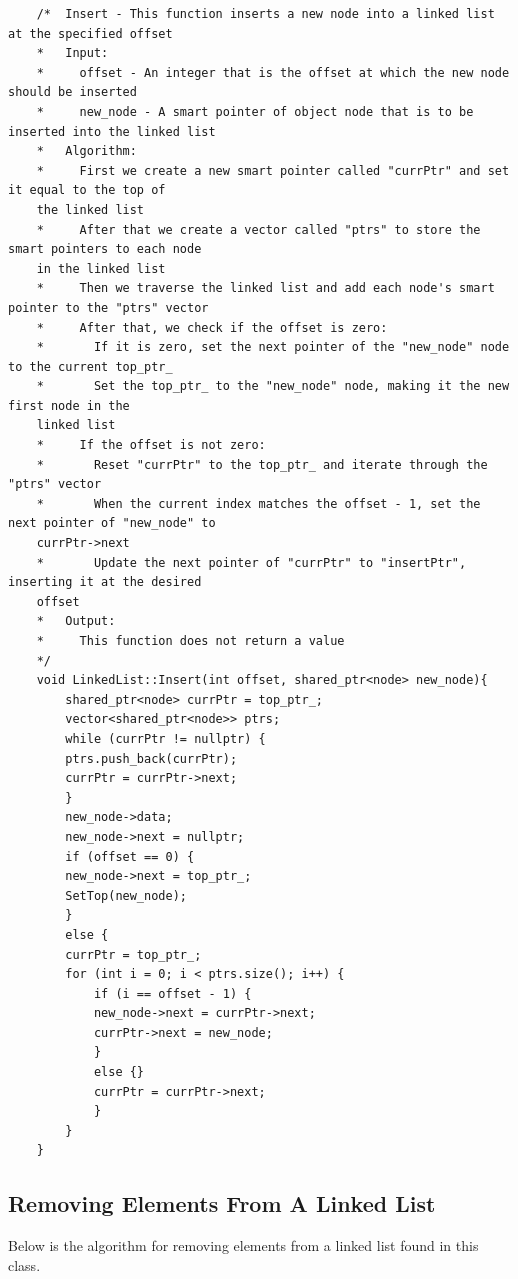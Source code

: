 \documentclass[a4paper,9pt]{article}
\begin{document}
\begin{highlight}
    \begin{verbatim}
    /*  Insert - This function inserts a new node into a linked list at the specified offset
    *   Input:
    *     offset - An integer that is the offset at which the new node should be inserted
    *     new_node - A smart pointer of object node that is to be inserted into the linked list
    *   Algorithm:
    *     First we create a new smart pointer called "currPtr" and set it equal to the top of 
    the linked list
    *     After that we create a vector called "ptrs" to store the smart pointers to each node 
    in the linked list
    *     Then we traverse the linked list and add each node's smart pointer to the "ptrs" vector
    *     After that, we check if the offset is zero:
    *       If it is zero, set the next pointer of the "new_node" node to the current top_ptr_
    *       Set the top_ptr_ to the "new_node" node, making it the new first node in the 
    linked list
    *     If the offset is not zero:
    *       Reset "currPtr" to the top_ptr_ and iterate through the "ptrs" vector
    *       When the current index matches the offset - 1, set the next pointer of "new_node" to 
    currPtr->next
    *       Update the next pointer of "currPtr" to "insertPtr", inserting it at the desired 
    offset
    *   Output:
    *     This function does not return a value
    */
    void LinkedList::Insert(int offset, shared_ptr<node> new_node){
        shared_ptr<node> currPtr = top_ptr_;
        vector<shared_ptr<node>> ptrs;
        while (currPtr != nullptr) {
        ptrs.push_back(currPtr);
        currPtr = currPtr->next;
        }
        new_node->data;
        new_node->next = nullptr;
        if (offset == 0) {
        new_node->next = top_ptr_;
        SetTop(new_node);
        }
        else {
        currPtr = top_ptr_;
        for (int i = 0; i < ptrs.size(); i++) {
            if (i == offset - 1) {
            new_node->next = currPtr->next;
            currPtr->next = new_node;
            }
            else {}
            currPtr = currPtr->next;
            }
        }
    }
    \end{verbatim}
\end{highlight}

\subsection*{Removing Elements From A Linked List}

Below is the algorithm for removing elements from a linked list found in this class.
\end{document}
